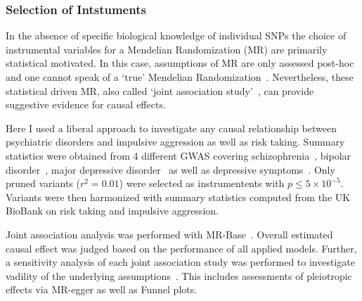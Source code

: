 \subsubsection{Selection of Intstuments}
\label{ssub:Selection_of_Intstuments}

In the absence of specific biological knowledge of individual SNPs the choice of instrumental variables for a Mendelian Randomization (MR) are primarily statistical motivated.
In this case, assumptions of MR are only assessed post-hoc and one cannot speak of a `true' Mendelian Randomization~\cite{Burgess2016a}.
Nevertheless, these statistical driven MR, also called `joint association study'~\cite{Burgess2016a}, can provide suggestive evidence for causal effects.

Here I used a liberal approach to investigate any causal relationship between psychiatric disorders and impulsive aggression as well as risk taking.
Summary statistics were obtained from 4 different GWAS covering schizophrenia~\cite{Ripke2014}, bipolar disorder~\cite{PsychiatricGWASConsortiumBipolarDisorderWorkingGroup2011}, major depressive disorder~\cite{MajorDepressiveDisorderWorkingGroupofthePsychiatricGWASConsortium2013} as well as depressive symptoms~\cite{Okbay2016}.
Only pruned variants ($r^2=0.01$) were selected as instrumentents with $p\leq 5\times 10^{-5}$.
Variants were then harmonized with summary statistics computed from the UK BioBank on risk taking and impulsive aggression. 

Joint association analysis was performed with MR-Base~\cite{Hemani2016}.
Overall estimated causal effect was judged based on the performance of all applied models.
Further, a sensitivity analysis of each joint association study was performed to investigate vadility of the underlying assumptions~\cite{Burgess2016}.  
This includes assessments of pleiotropic effects via MR-egger as well as Funnel plots.
